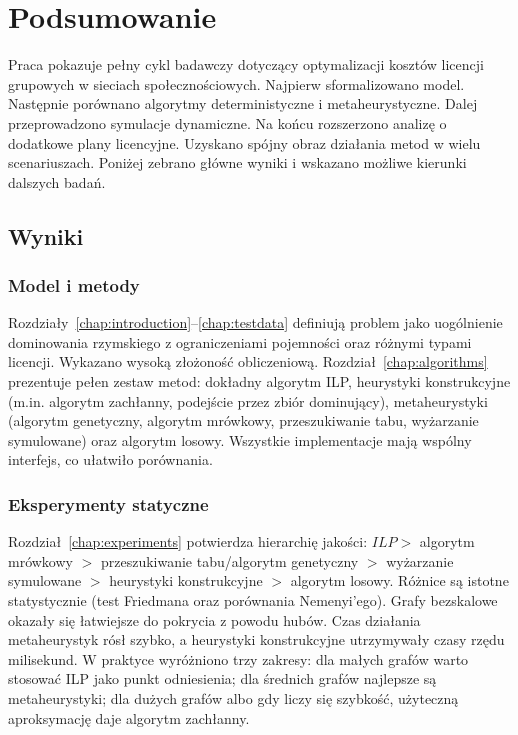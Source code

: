 \chapter{Podsumowanie}\label{chap:conclusion}

Praca pokazuje pełny cykl badawczy dotyczący optymalizacji kosztów licencji grupowych w sieciach społecznościowych. Najpierw sformalizowano model. Następnie porównano algorytmy deterministyczne i metaheurystyczne. Dalej przeprowadzono symulacje dynamiczne. Na końcu rozszerzono analizę o dodatkowe plany licencyjne. Uzyskano spójny obraz działania metod w wielu scenariuszach. Poniżej zebrano główne wyniki i wskazano możliwe kierunki dalszych badań.

\section{Wyniki}

\subsection{Model i metody}
Rozdziały~\ref{chap:introduction}--\ref{chap:testdata} definiują problem jako uogólnienie dominowania rzymskiego z ograniczeniami pojemności oraz różnymi typami licencji. Wykazano wysoką złożoność obliczeniową. Rozdział~\ref{chap:algorithms} prezentuje pełen zestaw metod: dokładny algorytm ILP, heurystyki konstrukcyjne (m.in. algorytm zachłanny, podejście przez zbiór dominujący), metaheurystyki (algorytm genetyczny, algorytm mrówkowy, przeszukiwanie tabu, wyżarzanie symulowane) oraz algorytm losowy. Wszystkie implementacje mają wspólny interfejs, co ułatwiło porównania.

\subsection{Eksperymenty statyczne}
Rozdział~\ref{chap:experiments} potwierdza hierarchię jakości: $ILP >$ algorytm mrówkowy $>$ przeszukiwanie tabu/algorytm genetyczny $>$ wyżarzanie symulowane $>$ heurystyki konstrukcyjne $>$ algorytm losowy. Różnice są istotne statystycznie (test Friedmana oraz porównania Nemenyi'ego). Grafy bezskalowe okazały się łatwiejsze do pokrycia z powodu hubów. Czas działania metaheurystyk rósł szybko, a heurystyki konstrukcyjne utrzymywały czasy rzędu milisekund. W praktyce wyróżniono trzy zakresy: dla małych grafów warto stosować ILP jako punkt odniesienia; dla średnich grafów najlepsze są metaheurystyki; dla dużych grafów albo gdy liczy się szybkość, użyteczną aproksymację daje algorytm zachłanny.

